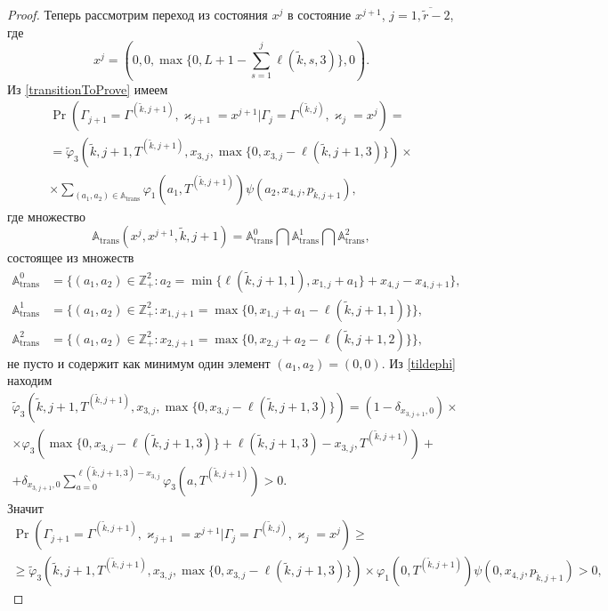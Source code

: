 \documentclass[a4paper,12pt,russian]{extarticle}
\begin{document}
\begin{proof}
Теперь рассмотрим переход из состояния $x^j$ в состояние $x^{j+1}$, $j=\overline{1,\tilde{r}-2}$, где
\begin{equation*}
x^j = (0,0,\max{\{0,L+1-\sum_{s=1}^{j} \ell(\tilde{k},s,3)\}},0).
\end{equation*}
Из \eqref{transitionToProve} имеем
\begin{multline*}
\Pr(\Gamma_{j+1}=\Gamma^{(\tilde{k},j+1)}, \varkappa_{j+1}=x^{j+1}|
\Gamma_{j}=\Gamma^{(\tilde{k},j)}, \varkappa_{j}=x^j)=\\
=\widetilde{\varphi}_3(\tilde{k},j+1,T^{(\tilde{k},j+1)},x_{3,j},\max{\{0,x_{3,j} - \ell(\tilde{k},j+1,3)\}})\times \\
\times
\sum_{(a_1,a_2)\in {\mathbb A}_{\mathrm{trans}}}\varphi_1(a_1,T^{(\tilde{k},j+1)})  \psi(a_2,x_{4,j}, p_{\tilde{k},j+1}),
\end{multline*}
где множество 
\begin{equation*}
{\mathbb A}_{\mathrm{trans}}(x^j,x^{j+1},\tilde{k},j+1) = {\mathbb A}_{\mathrm{trans}}^0 \bigcap {\mathbb A}_{\mathrm{trans}}^1\bigcap {\mathbb A}_{\mathrm{trans}}^2,
\end{equation*}
состоящее из множеств 
\begin{align*}
{\mathbb A}_{\mathrm{trans}}^0 &= \{(a_1,a_2) \in \mathbb{Z}_+^2 \colon a_2 = \min{\{\ell(\tilde{k},j+1,1), x_{1,j}+a_1}\} +x_{4,j}- x_{4,j+1}\},\\
{\mathbb A}_{\mathrm{trans}}^1 &= \{(a_1,a_2) \in \mathbb{Z}_+^2 \colon x_{1,j+1}=\max{\{0,x_{1,j}+a_1-\ell(\tilde{k},j+1,1)\}}\},\\
 {\mathbb A}_{\mathrm{trans}}^2 &= \{(a_1,a_2) \in \mathbb{Z}_+^2 \colon  x_{2,j+1} =\max{\{0,x_{2,j}+a_2-\ell(\tilde{k},j+1,2)\}}\},
\end{align*}
не пусто и содержит как минимум один элемент $(a_1,a_2)=(0,0)$. Из \eqref{tildephi} находим
\begin{multline*}
\widetilde{\varphi}_3(\tilde{k},j+1,T^{(\tilde{k},j+1)},x_{3,j},\max{\{0,x_{3,j} - \ell(\tilde{k},j+1,3)\}})= (1-\delta_{x_{3,j+1},0}) \times \\\times\varphi_3(\max{\{0,x_{3,j} - \ell(\tilde{k},j+1,3)\}} + \ell (\tilde{k},j+1,3) - x_{3,j},T^{(\tilde{k},j+1)} ) 
+\\+\delta_{x_{3,j+1},0} \sum_{a=0}^{\ell(\tilde{k},j+1,3)-x_{3,j}}\varphi_3 (a,T^{(\tilde{k},j+1)})>0.
\end{multline*}
Значит
\begin{multline*}
\Pr(\Gamma_{j+1}=\Gamma^{(\tilde{k},j+1)}, \varkappa_{j+1}=x^{j+1}|
\Gamma_{j}=\Gamma^{(\tilde{k},j)}, \varkappa_{j}=x^j)\geqslant \\
\geqslant \widetilde{\varphi}_3(\tilde{k},j+1,T^{(\tilde{k},j+1)},x_{3,j},\max{\{0,x_{3,j} - \ell(\tilde{k},j+1,3)\}})
\times
\varphi_1(0,T^{(\tilde{k},j+1)})  \psi(0,x_{4,j}, p_{\tilde{k},j+1}) > 0,
\end{multline*}


\end{proof}
\end{document}
